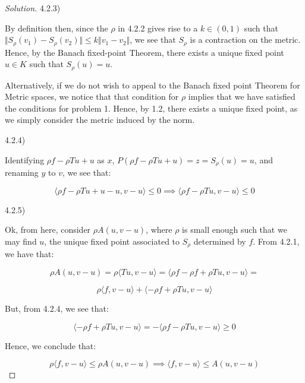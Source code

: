 \documentclass[10pt]{article}
\begin{document}
\begin{proof}[Solution]
4.2.3)

By definition then, since the $\rho$ in 4.2.2 gives rise to a $k \in (0,1)$ such that $ \Vert  S_\rho(v_1) - S_\rho(v_2)  \Vert \leq k  \Vert v_1 - v_2 \Vert$, we see that $S_\rho$ is a contraction on the metric. Hence, by the Banach fixed-point Theorem, there exists a unique fixed point $u \in K$ such that $S_\rho(u) = u$.

Alternatively, if we do not wish to appeal to the Banach fixed point Theorem for Metric spaces, we notice that that condition for $\rho$ implies that we have satisfied the conditions for problem 1. Hence, by 1.2, there exists a unique fixed point, as we simply consider the metric induced by the norm.

4.2.4)

Identifying $ \rho f - \rho T u + u$ as $x$, $P( \rho f - \rho T u + u) = z = S_\rho(u) = u$, and renaming $y$ to $v$, we see that:

$$\langle \rho f - \rho Tu + u - u, v - u \rangle \leq 0 \implies \langle \rho f - \rho Tu, v - u \rangle \leq 0$$

4.2.5)

Ok, from here, consider $\rho A(u, v - u)$, where $\rho$ is small enough such that we may find $u$, the unique fixed point associated to $S_\rho$ determined by $f$. From 4.2.1, we have that:

$$ \rho A(u, v -u) = \rho \langle Tu, v - u \rangle = \langle \rho f - \rho f + \rho T u, v - u \rangle = $$

$$ \rho \langle f, v - u \rangle + \langle - \rho f + \rho Tu, v - u \rangle$$

But, from 4.2.4, we see that:

$$ \langle - \rho f + \rho Tu, v - u \rangle  = -  \langle \rho f - \rho Tu, v - u \rangle \geq 0 $$

Hence, we conclude that:

$$ \rho \langle f, v - u \rangle \leq \rho A(u, v - u) \implies \langle f, v - u \rangle \leq A(u, v - u) $$





\end{proof}
\end{document}
